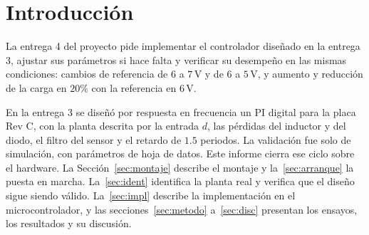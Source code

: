 \documentclass[conference,letterpaper]{IEEEtran}
\newcommand{\unit}[1]{\,\mathrm{#1}}
\begin{document}
\section{Introducción}
La entrega 4 del proyecto \cite{guide} pide implementar el controlador diseñado en la entrega 3, ajustar sus parámetros si hace falta y verificar su desempeño en las mismas condiciones: cambios de referencia de $6$ a $7\unit{V}$ y de $6$ a $5\unit{V}$, y aumento y reducción de la carga en $20\%$ con la referencia en $6\unit{V}$.

En la entrega 3 \cite{e3} se diseñó por respuesta en frecuencia un PI digital para la placa Rev C, con la planta descrita por la entrada $d$, las pérdidas del inductor y del diodo, el filtro del sensor y el retardo de $1.5$ periodos. La validación fue solo de simulación, con parámetros de hoja de datos. Este informe cierra ese ciclo sobre el hardware. La Sección~\ref{sec:montaje} describe el montaje y la~\ref{sec:arranque} la puesta en marcha. La~\ref{sec:ident} identifica la planta real y verifica que el diseño sigue siendo válido. La~\ref{sec:impl} describe la implementación en el microcontrolador, y las secciones~\ref{sec:metodo} a~\ref{sec:disc} presentan los ensayos, los resultados y su discusión.
\end{document}

